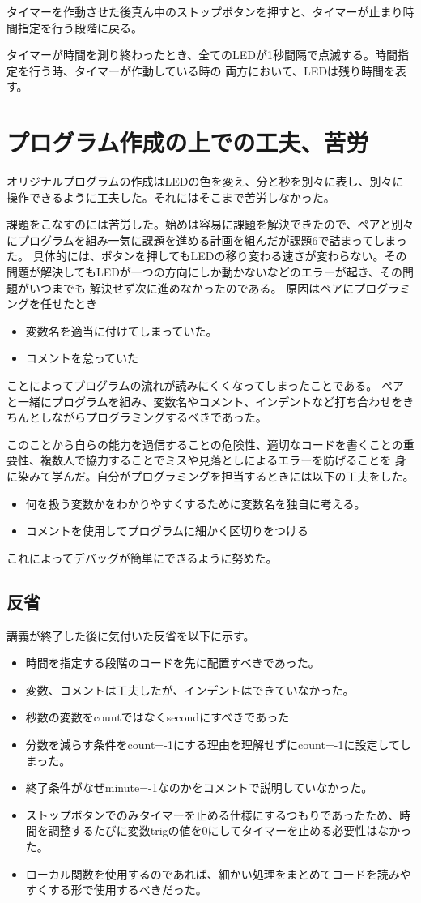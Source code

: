 \documentclass[a4paper,titlepage,11pt]{ltjsarticle}
\begin{document}
タイマーを作動させた後真ん中のストップボタンを押すと、タイマーが止まり時間指定を行う段階に戻る。

タイマーが時間を測り終わったとき、全てのLEDが1秒間隔で点滅する。時間指定を行う時、タイマーが作動している時の
両方において、LEDは残り時間を表す。
\section{プログラム作成の上での工夫、苦労}
オリジナルプログラムの作成はLEDの色を変え、分と秒を別々に表し、別々に操作できるように工夫した。それにはそこまで苦労しなかった。

課題をこなすのには苦労した。始めは容易に課題を解決できたので、ペアと別々にプログラムを組み一気に課題を進める計画を組んだが課題6で詰まってしまった。
具体的には、ボタンを押してもLEDの移り変わる速さが変わらない。その問題が解決してもLEDが一つの方向にしか動かないなどのエラーが起き、その問題がいつまでも
解決せず次に進めなかったのである。
原因はペアにプログラミングを任せたとき
\begin{itemize}
	\item 変数名を適当に付けてしまっていた。
	\item コメントを怠っていた
\end{itemize}
ことによってプログラムの流れが読みにくくなってしまったことである。
ペアと一緒にプログラムを組み、変数名やコメント、インデントなど打ち合わせをきちんとしながらプログラミングするべきであった。

このことから自らの能力を過信することの危険性、適切なコードを書くことの重要性、複数人で協力することでミスや見落としによるエラーを防げることを
身に染みて学んだ。自分がプログラミングを担当するときには以下の工夫をした。
\begin{itemize}
	\item 何を扱う変数かをわかりやすくするために変数名を独自に考える。
	\item コメントを使用してプログラムに細かく区切りをつける
\end{itemize}
これによってデバッグが簡単にできるように努めた。
\subsection{反省}
講義が終了した後に気付いた反省を以下に示す。
\begin{itemize}
  \item 時間を指定する段階のコードを先に配置すべきであった。
  \item 変数、コメントは工夫したが、インデントはできていなかった。
  \item 秒数の変数をcountではなくsecondにすべきであった
  \item 分数を減らす条件をcount=-1にする理由を理解せずにcount=-1に設定してしまった。
  \item 終了条件がなぜminute=-1なのかをコメントで説明していなかった。
	\item ストップボタンでのみタイマーを止める仕様にするつもりであったため、時間を調整するたびに変数trigの値を0にしてタイマーを止める必要性はなかった。
	\item ローカル関数を使用するのであれば、細かい処理をまとめてコードを読みやすくする形で使用するべきだった。
\end{itemize}
\end{document}
